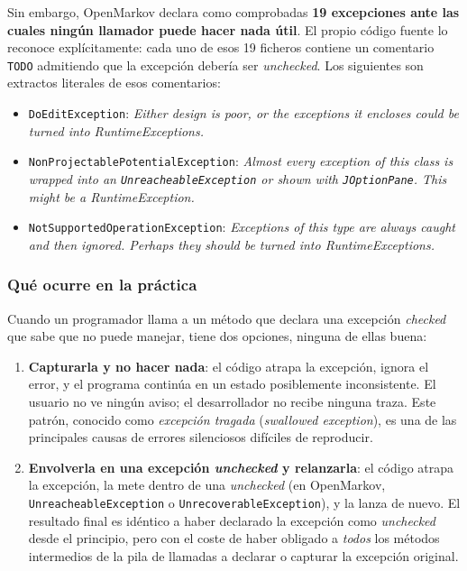 \documentclass[11pt,a4paper]{article}
\begin{document}
Sin embargo, OpenMarkov declara como comprobadas \textbf{19 excepciones ante las cuales ningún
llamador puede hacer nada útil}. El propio código fuente lo reconoce explícitamente: cada uno
de esos 19 ficheros contiene un comentario \texttt{TODO} admitiendo que la excepción debería
ser \textit{unchecked}. Los siguientes son extractos literales de esos comentarios:

\begin{itemize}[nosep]
    \item \texttt{DoEditException}: \textit{\guillemotleft Either design is poor, or the exceptions it encloses
          could be turned into RuntimeExceptions.\guillemotright }
    \item \texttt{NonProjectablePotentialException}: \textit{\guillemotleft Almost every exception of this class
          is wrapped into an \texttt{UnreacheableException} or shown with \texttt{JOptionPane}.
          This might be a RuntimeException.\guillemotright }
    \item \texttt{NotSupportedOperationException}: \textit{\guillemotleft Exceptions of this type are always
          caught and then ignored. Perhaps they should be turned into RuntimeExceptions.\guillemotright }
\end{itemize}

\subsubsection{Qué ocurre en la práctica}

Cuando un programador llama a un método que declara una excepción \textit{checked} que sabe que
no puede manejar, tiene dos opciones, ninguna de ellas buena:

\begin{enumerate}
    \item \textbf{Capturarla y no hacer nada}: el código atrapa la excepción, ignora el error, y
          el programa continúa en un estado posiblemente inconsistente. El usuario no ve ningún
          aviso; el desarrollador no recibe ninguna traza. Este patrón, conocido como
          \emph{excepción tragada} (\textit{swallowed exception}), es una de las principales
          causas de errores silenciosos difíciles de reproducir.

    \item \textbf{Envolverla en una excepción \textit{unchecked} y relanzarla}: el código atrapa
          la excepción, la mete dentro de una \textit{unchecked} (en OpenMarkov,
          \texttt{UnreacheableException} o \texttt{UnrecoverableException}), y la lanza de nuevo.
          El resultado final es idéntico a haber declarado la excepción como \textit{unchecked}
          desde el principio, pero con el coste de haber obligado a \emph{todos} los métodos
          intermedios de la pila de llamadas a declarar o capturar la excepción original.
\end{enumerate}
\end{document}
